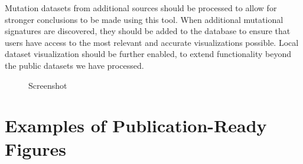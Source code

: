 \documentclass[12pt, letterpaper]{article}
\begin{document}
Mutation datasets from additional sources should be processed to allow for stronger conclusions to be made using this tool.
When additional mutational signatures are discovered, they should be added to the database to ensure that users have access to the most relevant and accurate visualizations possible.
Local dataset visualization should be further enabled, to extend functionality beyond the public datasets we have processed.


{}


\pagebreak

\begin{figure}
    \centering
    \caption{Screenshot}
\end{figure}

\appendix                                     
\section{Examples of Publication-Ready Figures}
\renewcommand{\figurename}{Example Figure}
\setcounter{figure}{0}
\end{document}
